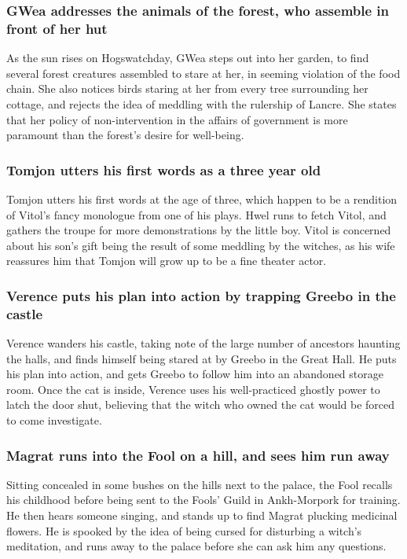 \subsubsection{\Gls{GWea} addresses the animals of the forest, who assemble in front of her hut}
As the sun rises on Hogswatchday, \Gls{GWea} steps out into her garden, to find several forest
creatures assembled to stare at her, in seeming violation of the food chain. She also notices birds
staring at her from every tree surrounding her cottage, and rejects the idea of meddling with the
rulership of Lancre. She states that her policy of non-intervention in the affairs of government is
more paramount than the forest's desire for well-being.

\subsubsection{\Gls{Tomjon} utters his first words as a three year old}
\Gls{Tomjon} utters his first words at the age of three, which happen to be a rendition of
\Gls{Vitol}'s fancy monologue from one of his plays. \Gls{Hwel} runs to fetch \Gls{Vitol}, and
gathers the troupe for more demonstrations by the little boy. \Gls{Vitol} is concerned about his
son's gift being the result of some meddling by the witches, as his wife reassures him that
\Gls{Tomjon} will grow up to be a fine theater actor.

\subsubsection{\Gls{Verence} puts his plan into action by trapping \Gls{Greebo} in the castle}
\Gls{Verence} wanders his castle, taking note of the large number of ancestors haunting the halls,
and finds himself being stared at by \Gls{Greebo} in the Great Hall. He puts his plan into action,
and gets \Gls{Greebo} to follow him into an abandoned storage room. Once the cat is inside,
\Gls{Verence} uses his well-practiced ghostly power to latch the door shut, believing that the witch
who owned the cat would be forced to come investigate.

\subsubsection{\Gls{Magrat} runs into the \Gls{Fool} on a hill, and sees him run away}
Sitting concealed in some bushes on the hills next to the palace, the \Gls{Fool} recalls his
childhood before being sent to the Fools' Guild in Ankh-Morpork for training. He then hears someone
singing, and stands up to find \Gls{Magrat} plucking medicinal flowers. He is spooked by the idea of
being cursed for disturbing a witch's meditation, and runs away to the palace before she can ask
him any questions.

